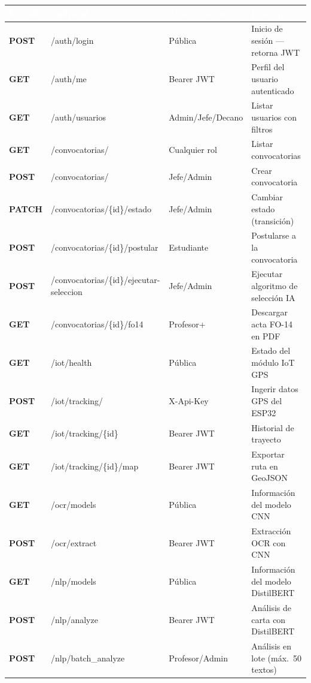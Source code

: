 \documentclass[12pt,a4paper,twoside]{report}
\begin{document}
\begin{center}
\begin{tabularx}{\textwidth}{|>{\bfseries}l|p{6.5cm}|p{3cm}|X|}
\hline
\rowcolor{tableHdr}
\textcolor{white}{\textbf{Método}} &
\textcolor{white}{\textbf{Endpoint}} &
\textcolor{white}{\textbf{Autenticación}} &
\textcolor{white}{\textbf{Descripción}} \\
\hline
\rowcolor{rowOdd}POST & /auth/login & Pública & Inicio de sesión — retorna JWT \\
\hline\rowcolor{rowEven}GET & /auth/me & Bearer JWT & Perfil del usuario autenticado \\
\hline\rowcolor{rowOdd}GET & /auth/usuarios & Admin/Jefe/Decano & Listar usuarios con filtros \\
\hline\rowcolor{rowEven}GET & /convocatorias/ & Cualquier rol & Listar convocatorias \\
\hline\rowcolor{rowOdd}POST & /convocatorias/ & Jefe/Admin & Crear convocatoria \\
\hline\rowcolor{rowEven}PATCH & /convocatorias/\{id\}/estado & Jefe/Admin & Cambiar estado (transición) \\
\hline\rowcolor{rowOdd}POST & /convocatorias/\{id\}/postular & Estudiante & Postularse a la convocatoria \\
\hline\rowcolor{rowEven}POST & /convocatorias/\{id\}/ejecutar-seleccion & Jefe/Admin & Ejecutar algoritmo de selección IA \\
\hline\rowcolor{rowOdd}GET & /convocatorias/\{id\}/fo14 & Profesor+ & Descargar acta FO-14 en PDF \\
\hline\rowcolor{rowEven}GET & /iot/health & Pública & Estado del módulo IoT GPS \\
\hline\rowcolor{rowOdd}POST & /iot/tracking/ & X-Api-Key & Ingerir datos GPS del ESP32 \\
\hline\rowcolor{rowEven}GET & /iot/tracking/\{id\} & Bearer JWT & Historial de trayecto \\
\hline\rowcolor{rowOdd}GET & /iot/tracking/\{id\}/map & Bearer JWT & Exportar ruta en GeoJSON \\
\hline\rowcolor{rowEven}GET & /ocr/models & Pública & Información del modelo CNN \\
\hline\rowcolor{rowOdd}POST & /ocr/extract & Bearer JWT & Extracción OCR con CNN \\
\hline\rowcolor{rowEven}GET & /nlp/models & Pública & Información del modelo DistilBERT \\
\hline\rowcolor{rowOdd}POST & /nlp/analyze & Bearer JWT & Análisis de carta con DistilBERT \\
\hline\rowcolor{rowEven}POST & /nlp/batch\_analyze & Profesor/Admin & Análisis en lote (máx.\ 50 textos) \\
\hline
\end{tabularx}
\end{center}
\end{document}
